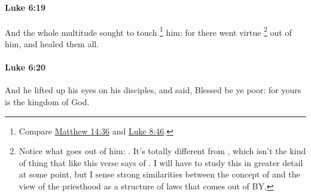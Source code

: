 		\paragraph{Luke 6:19} %
			\label{LUKE-6-19}

			And the whole multitude sought to touch%
				\footnote{%
					Compare \hyperref[MATTHEW-14-36]{Matthew 14:36} and \hyperref[LUKE-8-46]{Luke 8:46}.
					}
			him: for there went virtue%
				\footnote{%
					Notice what goes out of him: . It's totally different from , which isn't the kind of thing that  like this verse says of . I will have to study this in greater detail at some point, but I sense strong similarities between the concept of  and the view of the priesthood as a structure of laws that comes out of BY.
					} 
			out of him, and healed them all.

			\begin{framed}
			\scriptsize
				\begin{compactdesc}
					\item[SBLG]  \hyperref[DUNAMIS]{} 
				\end{compactdesc}
			\end{framed}

		\paragraph{Luke 6:20} %
			\label{LUKE-6-20}

			And he lifted up his eyes on his disciples, and said, Blessed be ye poor: for yours is the kingdom of God.

